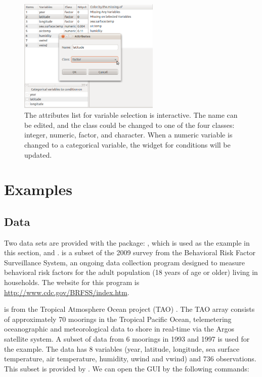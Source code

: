 \documentclass[article]{jss}
\begin{document}
\begin{center}
\begin{figure}[h]
\begin{centering}
\includegraphics[width=0.6\textwidth]{fig9}
\par\end{centering}
\label{fig: attributes}
\caption{The attributes list for variable selection is interactive. The name can be edited, and the class could be changed to one of the four classes: integer, numeric, factor, and character. When a numeric variable is changed to a categorical variable, the widget for conditions will be updated.}
\end{figure}
\par\end{center}


\section{Examples}

\subsection{Data}

Two data sets are provided with the package: , which is used as the example in this section, and .  is a subset of the 2009 survey from the Behavioral Risk Factor Surveillance System, an ongoing data collection program designed to measure behavioral risk factors for the adult population (18 years of age or older) living in households. The website for this program is \url{http://www.cdc.gov/BRFSS/index.htm}.

 is from the Tropical Atmosphere Ocean project (TAO) \citep{tao}. The TAO array consists of approximately 70 moorings in the Tropical Pacific Ocean, telemetering oceanographic and meteorological data to shore in real-time via the Argos satellite system. A subset of data from 6 moorings in 1993 and 1997 is used for the example. The data has 8 variables (year, latitude, longitude, sea surface temperature, air temperature, humidity, uwind and vwind) and 736 observations. This subset is provided by \citet{CS07}. We can open the GUI by the following commands:
\end{document}
